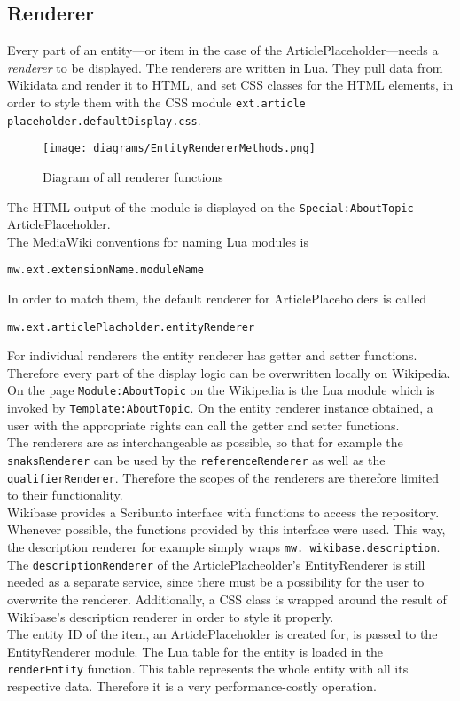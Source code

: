 \subsection{Renderer}

Every part of an entity---or item in the case of the ArticlePlaceholder---needs a \textit{renderer} to be displayed. The renderers are written in Lua. They pull data from Wikidata and render it to HTML, and set CSS classes for the HTML elements, in order to style them with the CSS module \texttt{\justify ext.article placeholder.defaultDisplay.css}.

\begin{figure}[H]
	\centering
	\texttt{[image: diagrams/EntityRendererMethods.png]}
	\caption{Diagram of all renderer functions}
	\label{fig:renderer}
\end{figure}

The HTML output of the module is displayed on the \texttt{\justify Special:AboutTopic} ArticlePlaceholder. \\
The MediaWiki conventions for naming Lua modules is 
\begin{center}
\texttt{\justify mw.ext.extensionName.moduleName} 
\end{center}
In order to match them, the default renderer for ArticlePlaceholders is called 
\begin{center}
\texttt{\justify mw.ext.articlePlacholder.entityRenderer}
\end{center}
For individual renderers the entity renderer has getter and setter functions. Therefore every part of the display logic can be overwritten locally on Wikipedia. \\
On the page \texttt{\justify Module:AboutTopic} on the Wikipedia is the Lua module which is invoked by \texttt{\justify Template:AboutTopic}. On the entity renderer instance obtained, a user with the appropriate rights can call the getter and setter functions. \\
The renderers are as interchangeable as possible, so that for example the \texttt{\justify snaksRenderer} can be used by the \texttt{\justify referenceRenderer} as well as the \texttt{\justify qualifierRenderer}. Therefore the scopes of the renderers are therefore limited to their functionality. \\
Wikibase provides a Scribunto interface with functions to access the repository. Whenever possible, the functions provided by this interface were used. This way, the description renderer for example simply wraps \texttt{\justify mw. wikibase.description}. The \texttt{\justify descriptionRenderer} of the ArticlePlacheolder's EntityRenderer is still needed as a separate service, since there must be a possibility for the user to overwrite the renderer. Additionally, a CSS class is wrapped around the result of Wikibase's description renderer in order to style it properly. \\
The entity ID of the item, an ArticlePlaceholder is created for, is passed to the EntityRenderer module. The Lua table for the entity is loaded in the \texttt{\justify renderEntity} function. This table represents the whole entity with all its respective data. Therefore it is a very performance-costly operation. \\